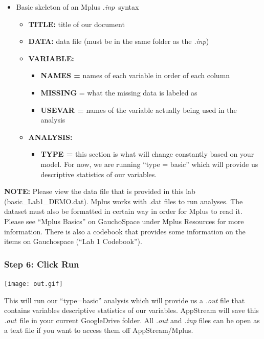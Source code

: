 \documentclass[
]{article}
\providecommand{\tightlist}{%
  \setlength{\itemsep}{0pt}\setlength{\parskip}{0pt}}
\begin{document}
\begin{itemize}
\item
  Basic skeleton of an Mplus \emph{.inp}~syntax

  \begin{itemize}
  \item
    \textbf{TITLE:} title of our document
  \item
    \textbf{DATA:} data file (must be in the same folder as the
    \emph{.inp})
  \item
    \textbf{VARIABLE:}

    \begin{itemize}
    \item
      \textbf{NAMES =} names of each variable in order of each column
    \item
      \textbf{MISSING} = what the missing data is labeled as
    \item
      \textbf{USEVAR =} names of the variable actually being used in the
      analysis
    \end{itemize}
  \item
    \textbf{ANALYSIS:}

    \begin{itemize}
    \tightlist
    \item
      \textbf{TYPE =} this section is what will change constantly based
      on your model. For now, we are running ``type = basic'' which will
      provide us descriptive statistics of our variables.
    \end{itemize}
  \end{itemize}
\end{itemize}

\textbf{NOTE:} Please view the data file that is provided in this lab
(basic\_Lab1\_DEMO.dat). Mplus works with .dat files to run analyses.
The dataset must also be formatted in certain way in order for Mplus to
read it. Please see ``Mplus Basics'' on GauchoSpace under Mplus
Resources for more information. There is also a codebook that provides
some information on the items on Gauchospace (``Lab 1 Codebook'').

\hypertarget{step-6-click-run}{%
\subsubsection{Step 6: Click Run}\label{step-6-click-run}}

\texttt{[image: out.gif]}

This will run our ``type=basic'' analysis which will provide us a
\emph{.out} file that contains variables descriptive statistics of our
variables. AppStream will save this \emph{.out}~file in your current
GoogleDrive folder. All \emph{.out} and \emph{.inp} files can be open as
a text file if you want to access them off AppStream/Mplus.
\end{document}
